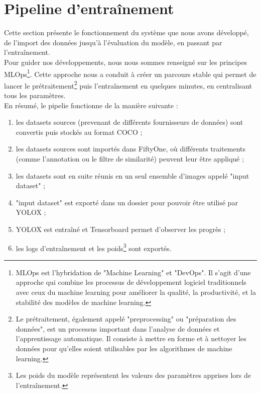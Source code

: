 \section{Pipeline d'entraînement}

Cette section présente le fonctionnement du système que nous avons développé, de l'import des données
jusqu'à l'évaluation du modèle, en passant par l'entraînement. \\

Pour guider nos développements, nous
nous sommes renseigné sur les principes MLOps\footnote{MLOps est l'hybridation de "Machine Learning" et "DevOps".
Il s'agit d'une approche qui combine les processus de développement logiciel traditionnels avec ceux
du machine learning pour améliorer la qualité, la productivité, et la stabilité des modèles de machine learning.}.
Cette approche nous a conduit à créer un parcours stable qui permet de lancer le prétraitement\footnote{
Le prétraitement, également appelé "preprocessing" ou "préparation des données",
est un processus important dans l'analyse de données et l'apprentissage automatique.
Il consiste à mettre en forme et à nettoyer les données pour qu'elles soient utilisables
par les algorithmes de machine learning.} puis l'entraînement en quelques minutes, en
centralisant tous les paramètres.\\

En résumé, le pipelie fonctionne de la manière suivante :

\begin{enumerate}
    \item les datasets sources (prevenant de différents fournisseurs de données) sont convertis puis stockés au format
    COCO ;
    \item les datasets sources sont importés dans FiftyOne, où différents traitements (comme
    l'annotation ou le filtre de similarité) peuvent leur être appliqué ;
    \item les datasets sont en suite réunis en un seul ensemble d'images appelé "input dataset" ;
    \item "input dataset" est exporté dans un dossier pour pouvoir être utilisé par YOLOX ;
    \item YOLOX est entraîné et Tensorboard permet d'observer les progrès ; 
    \item les logs d'entraînement et les poids\footnote{Les poids du modèle représentent
    les valeurs des paramètres apprises lors de l'entraînement.} sont exportés.
\end{enumerate}

